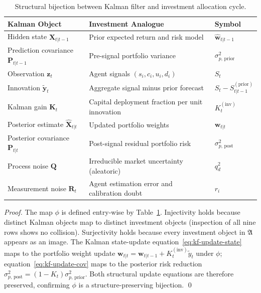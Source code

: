 \documentclass[12pt,openany]{book}
\numberwithin{equation}{chapter}
\theoremstyle{plain}
\theoremstyle{definition}
\theoremstyle{remark}
\begin{document}
\begin{table}[H]
\centering
\caption{Structural bijection between Kalman filter and investment
  allocation cycle.}
\label{tab:bijection}
\small
\begin{tabularx}{\linewidth}{@{} p{5.0cm} X p{3.5cm} @{}}
\toprule
\textbf{Kalman Object} & \textbf{Investment Analogue}
  & \textbf{Symbol} \\
\midrule
Hidden state $\hat{\mathbf{X}}_{t|t-1}$
  & Prior expected return and risk model
  & $\hat{\mathbf{w}}_{t|t-1}$ \\
Prediction covariance $\mathbf{P}_{t|t-1}$
  & Pre-signal portfolio variance
  & $\sigma_{p,\,\mathrm{prior}}^2$ \\
Observation $\mathbf{z}_t$
  & Agent signals $(s_i, c_i, u_i, d_i)$
  & $S_t$ \\
Innovation $\tilde{\mathbf{y}}_t$
  & Aggregate signal minus prior forecast
  & $S_t - S_{t|t-1}^{(\mathrm{prior})}$ \\
Kalman gain $\mathbf{K}_t$
  & Capital deployment fraction per unit innovation
  & $K_t^{(\mathrm{inv})}$ \\
Posterior estimate $\hat{\mathbf{X}}_{t|t}$
  & Updated portfolio weights
  & $\mathbf{w}_{t|t}$ \\
Posterior covariance $\mathbf{P}_{t|t}$
  & Post-signal residual portfolio risk
  & $\sigma_{p,\,\mathrm{post}}^2$ \\
Process noise $\mathbf{Q}$
  & Irreducible market uncertainty (aleatoric)
  & $q_d^2$ \\
Measurement noise $\mathbf{R}_t$
  & Agent estimation error and calibration doubt
  & $r_i$ \\
\bottomrule
\end{tabularx}
\end{table}

\begin{proof}
The map $\phi$ is defined entry-wise by Table~\ref{tab:bijection}.
Injectivity holds because distinct Kalman objects map to distinct
investment objects (inspection of all nine rows shows no
collision).  Surjectivity holds because every investment object
in $\mathfrak{A}$ appears as an image.  The Kalman state-update
equation~\eqref{eq:kf-update-state} maps to the portfolio weight
update $\mathbf{w}_{t|t} = \mathbf{w}_{t|t-1} + K_t^{(\mathrm{inv})}
\tilde{y}_t$ under $\phi$; equation~\eqref{eq:kf-update-cov} maps
to the posterior risk reduction
$\sigma_{p,\,\mathrm{post}}^2 = (1 - K_t) \sigma_{p,\,\mathrm{prior}}^2$.
Both structural update equations are therefore preserved, confirming
$\phi$ is a structure-preserving bijection.
\qed
\end{proof}
\end{document}
